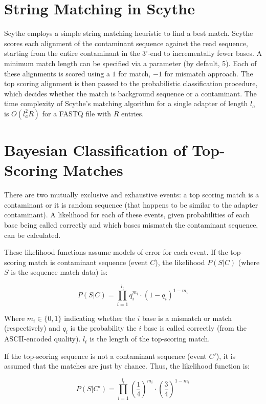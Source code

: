 \documentclass{bioinfo}
\begin{document}
\begin{methods}
\section{String Matching in Scythe}

Scythe employs a simple string matching heuristic to find a best
match. Scythe scores each alignment of the contaminant sequence
against the read sequence, starting from the entire contaminant in the
3'-end to incrementally fewer bases. A minimum match length can be
specified via a parameter (by default, 5). Each of these alignments is
scored using a $1$ for match, $-1$ for mismatch approach. The top
scoring alignment is then passed to the probabilistic classification
procedure, which decides whether the match is background sequence or a
contaminant. The time complexity of Scythe's matching algorithm for a
single adapter of length $l_a$ is $O(l_a^2 R)$ for a FASTQ file with
$R$ entries.


\section{Bayesian Classification of Top-Scoring Matches}

There are two mutually exclusive and exhaustive events: a top scoring
match is a contaminant or it is random sequence (that happens to be
similar to the adapter contaminant). A likelihood for each of these
events, given probabilities of each base being called correctly and
which bases mismatch the contaminant sequence, can be calculated.

These likelihood functions assume models of error for each event. If
the top-scoring match is contaminant sequence (event $C$), the
likelihood $P(S | C)$ (where $S$ is the sequence match data) is:

$$ P(S | C) = \prod_{i=1}^{l_t} q_i^{m_i} \cdot (1-q_i)^{1 - m_i} $$

Where $m_i \in \{0, 1\}$ indicating whether the $i$ base is a mismatch
or match (respectively) and $q_i$ is the probability the $i$ base is
called correctly (from the ASCII-encoded quality). $l_t$ is the length
of the top-scoring match.

If the top-scoring sequence is not a contaminant sequence (event
$C'$), it is assumed that the matches are just by chance. Thus, the
likelihood function is:

$$ P(S | C') = \prod_{i=1}^{l_t} \left(\frac{1}{4}\right)^{m_i} \cdot \left(\frac{3}{4}\right)^{1 - m_i} $$


\end{methods}
\end{document}
